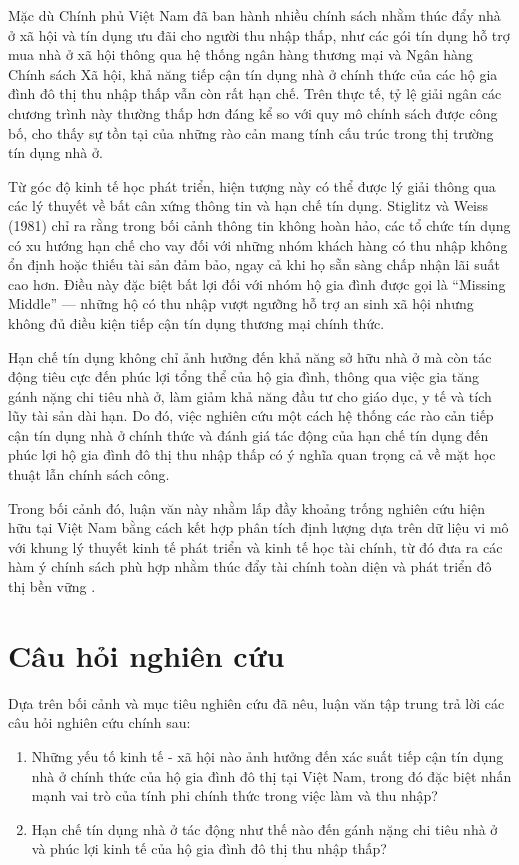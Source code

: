 \documentclass[12pt,a4paper]{report}
\begin{document}
	Mặc dù Chính phủ Việt Nam đã ban hành nhiều chính sách nhằm thúc đẩy nhà ở xã hội và tín dụng ưu đãi cho người thu nhập thấp, như các gói tín dụng hỗ trợ mua nhà ở xã hội thông qua hệ thống ngân hàng thương mại và Ngân hàng Chính sách Xã hội, khả năng tiếp cận tín dụng nhà ở chính thức của các hộ gia đình đô thị thu nhập thấp vẫn còn rất hạn chế. Trên thực tế, tỷ lệ giải ngân các chương trình này thường thấp hơn đáng kể so với quy mô chính sách được công bố, cho thấy sự tồn tại của những rào cản mang tính cấu trúc trong thị trường tín dụng nhà ở.
	
	Từ góc độ kinh tế học phát triển, hiện tượng này có thể được lý giải thông qua các lý thuyết về bất cân xứng thông tin và hạn chế tín dụng. Stiglitz và Weiss (1981) chỉ ra rằng trong bối cảnh thông tin không hoàn hảo, các tổ chức tín dụng có xu hướng hạn chế cho vay đối với những nhóm khách hàng có thu nhập không ổn định hoặc thiếu tài sản đảm bảo, ngay cả khi họ sẵn sàng chấp nhận lãi suất cao hơn. Điều này đặc biệt bất lợi đối với nhóm hộ gia đình được gọi là ``Missing Middle'' --- những hộ có thu nhập vượt ngưỡng hỗ trợ an sinh xã hội nhưng không đủ điều kiện tiếp cận tín dụng thương mại chính thức.
	
	Hạn chế tín dụng không chỉ ảnh hưởng đến khả năng sở hữu nhà ở mà còn tác động tiêu cực đến phúc lợi tổng thể của hộ gia đình, thông qua việc gia tăng gánh nặng chi tiêu nhà ở, làm giảm khả năng đầu tư cho giáo dục, y tế và tích lũy tài sản dài hạn. Do đó, việc nghiên cứu một cách hệ thống các rào cản tiếp cận tín dụng nhà ở chính thức và đánh giá tác động của hạn chế tín dụng đến phúc lợi hộ gia đình đô thị thu nhập thấp có ý nghĩa quan trọng cả về mặt học thuật lẫn chính sách công.
	
	Trong bối cảnh đó, luận văn này nhằm lấp đầy khoảng trống nghiên cứu hiện hữu tại Việt Nam bằng cách kết hợp phân tích định lượng dựa trên dữ liệu vi mô với khung lý thuyết kinh tế phát triển và kinh tế học tài chính, từ đó đưa ra các hàm ý chính sách phù hợp nhằm thúc đẩy tài chính toàn diện và phát triển đô thị bền vững \parencite{Stiglitz1981}.
	
	\section{Câu hỏi nghiên cứu}
	
	Dựa trên bối cảnh và mục tiêu nghiên cứu đã nêu, luận văn tập trung trả lời các câu hỏi nghiên cứu chính sau:
	
	\begin{enumerate}
		\item Những yếu tố kinh tế - xã hội nào ảnh hưởng đến xác suất tiếp cận tín dụng nhà ở chính thức của hộ gia đình đô thị tại Việt Nam, trong đó đặc biệt nhấn mạnh vai trò của tính phi chính thức trong việc làm và thu nhập?
		\item Hạn chế tín dụng nhà ở tác động như thế nào đến gánh nặng chi tiêu nhà ở và phúc lợi kinh tế của hộ gia đình đô thị thu nhập thấp?
	\end{enumerate}
	
\end{document}
